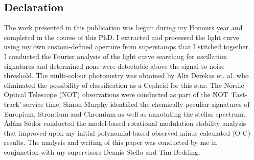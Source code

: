 

\subsection*{Declaration}
The work presented in this publication was begun during my Honours year and completed in the course of this PhD. I extracted and processed the light curve using my own custom-defined aperture from superstamps that I stitched together. I conducted the Fourier analysis of the light curve searching for oscillation signatures and determined none were detectable above the signal-to-noise threshold. The multi-colour photometry was obtained by Aliz Derekas et. al. who eliminated the possibility of classification as a Cepheid for this star. The Nordic Optical Telescope (NOT) observations were conducted as part of the NOT `Fast-track' service time. Simon Murphy identified the chemically peculiar signatures of Europium, Strontium and Chromium as well as annotating the stellar spectrum. \'Ad\'am S\'odor conducted the model-based rotational modulation stability analysis that improved upon my initial polynomial-based observed minus calculated (O-C) results. The analysis and writing of this paper was conducted by me in conjunction with my supervisors Dennis Stello and Tim Bedding.

